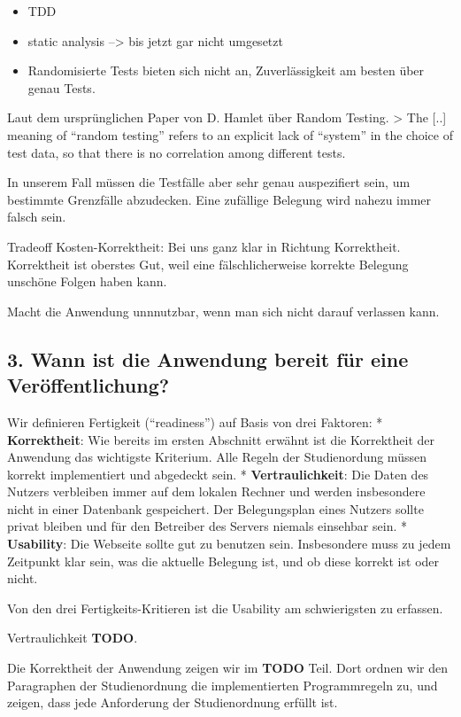 \documentclass[]{article}
\begin{document}
\begin{itemize}
\item
  TDD
\item
  static analysis --\textgreater{} bis jetzt gar nicht umgesetzt
\item
  Randomisierte Tests bieten sich nicht an, Zuverlässigkeit am besten
  über genau Tests.
\end{itemize}

Laut dem ursprünglichen Paper von D. Hamlet über Random Testing.
\textgreater{} The {[}..{]} meaning of ``random testing'' refers to an
explicit lack of ``system'' in the choice of test data, so that there is
no correlation among different tests.

In unserem Fall müssen die Testfälle aber sehr genau auspezifiert sein,
um bestimmte Grenzfälle abzudecken. Eine zufällige Belegung wird nahezu
immer falsch sein.

Tradeoff Kosten-Korrektheit: Bei uns ganz klar in Richtung Korrektheit.
Korrektheit ist oberstes Gut, weil eine fälschlicherweise korrekte
Belegung unschöne Folgen haben kann.

Macht die Anwendung unnnutzbar, wenn man sich nicht darauf verlassen
kann.

\subsection{3. Wann ist die Anwendung bereit für eine
Veröffentlichung?}\label{wann-ist-die-anwendung-bereit-fuxfcr-eine-veruxf6ffentlichung}

Wir definieren Fertigkeit (``readiness'') auf Basis von drei Faktoren: *
\textbf{Korrektheit}: Wie bereits im ersten Abschnitt erwähnt ist die
Korrektheit der Anwendung das wichtigste Kriterium. Alle Regeln der
Studienordung müssen korrekt implementiert und abgedeckt sein. *
\textbf{Vertraulichkeit}: Die Daten des Nutzers verbleiben immer auf dem
lokalen Rechner und werden insbesondere nicht in einer Datenbank
gespeichert. Der Belegungsplan eines Nutzers sollte privat bleiben und
für den Betreiber des Servers niemals einsehbar sein. *
\textbf{Usability}: Die Webseite sollte gut zu benutzen sein.
Insbesondere muss zu jedem Zeitpunkt klar sein, was die aktuelle
Belegung ist, und ob diese korrekt ist oder nicht.

Von den drei Fertigkeits-Kritieren ist die Usability am schwierigsten zu
erfassen.

Vertraulichkeit \textbf{TODO}.

Die Korrektheit der Anwendung zeigen wir im \textbf{TODO} Teil. Dort
ordnen wir den Paragraphen der Studienordnung die implementierten
Programmregeln zu, und zeigen, dass jede Anforderung der Studienordnung
erfüllt ist.
\end{document}
